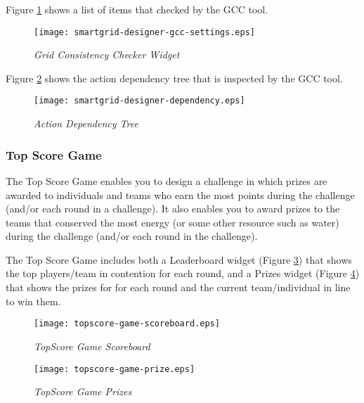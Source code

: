 Figure \ref{fig:smartgrid-designer-gcc-settings} shows a list of items that checked by the GCC tool. 

\begin{figure}[!ht]
  \center
  \texttt{[image: smartgrid-designer-gcc-settings.eps]}
  \caption{\em Grid Consistency Checker Widget}
  \label{fig:smartgrid-designer-gcc-settings}
\end{figure}

Figure \ref{fig:smartgrid-designer-dependency} shows the action dependency tree that is inspected by the GCC tool. 

 \begin{figure}[!ht]
  \center
  \texttt{[image: smartgrid-designer-dependency.eps]}
  \caption{\em Action Dependency Tree}
  \label{fig:smartgrid-designer-dependency}
\end{figure}

\clearpage

\subsubsection{Top Score Game}

The Top Score Game enables you to design a challenge in which prizes are awarded to individuals and teams who earn the most points during the challenge (and/or each round in a challenge). It also enables you to award prizes to the teams that conserved the most energy (or some other resource such as water) during the challenge (and/or each round in the challenge).

The Top Score Game includes both a Leaderboard widget (Figure \ref{fig:topscore-game-scoreboard}) that shows the top players/team in contention for each round, and a Prizes widget (Figure \ref{fig:topscore-game-prize}) that shows the prizes for for each round and the current team/individual in line to win them.

\begin{figure}[!ht]
  \center
  \texttt{[image: topscore-game-scoreboard.eps]}
  \caption{\em TopScore Game Scoreboard}
  \label{fig:topscore-game-scoreboard}
\end{figure}

\begin{figure}[!ht]
  \center
  \texttt{[image: topscore-game-prize.eps]}
  \caption{\em TopScore Game Prizes}
  \label{fig:topscore-game-prize}
\end{figure}

